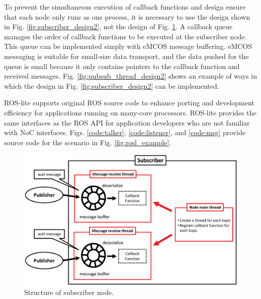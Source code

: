 To prevent the simultaneous execution of callback functions and design ensure that each node only runs as one process, it is necessary to use the design shown in Fig. \ref{fig:subscriber_design2}, not the design of Fig. \ref{fig:subscriber_design1}.
A callback queue manages the order of callback functions to be executed at the subscriber node.
This queue can be implemented simply with eMCOS message buffering.
eMCOS messaging is suitable for small-size data transport, and the data pushed for the queue is small because it only contains pointers to the callback function and received messages.
Fig. \ref{fig:pubsub_thread_design2} shows an example of ways in which the design in Fig. \ref{fig:subscriber_design2} can be implemented.

ROS-lite supports original ROS source code to enhance porting and development efficiency for applications running on many-core processors.
ROS-lite provides the same interfaces as the ROS API for application developers who are not familiar with NoC interfaces.
Figs. \ref{code:talker}, \ref{code:listener}, and \ref{code:msg} provide source code for the scenario in Fig. \ref{fig:rosl_example}.

\clearpage
\vspace{-10mm}

\begin{figure}[thbp]
  \centering
  \includegraphics[width=0.9\linewidth]{../figure/roslite/design/subscriber_design1.eps}
  \vspace{-10mm}
  \caption{\label{fig:subscriber_design1}
    Structure of subscriber node.}
  \vspace{-10mm}
\end{figure}


